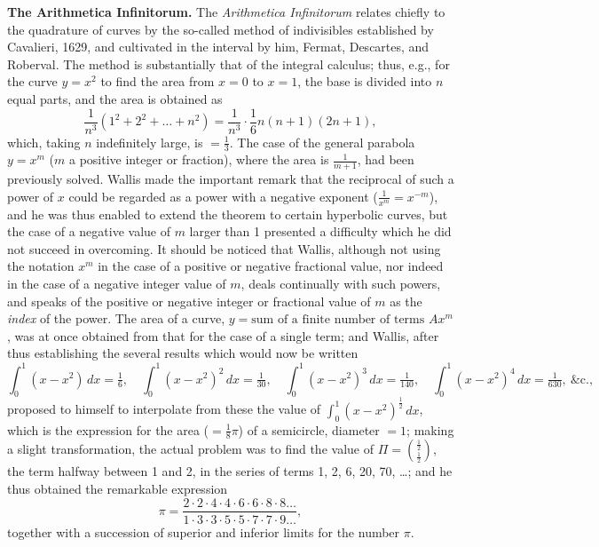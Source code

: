 \documentclass[11pt,a4paper]{book}
\begin{document}
\textbf{The Arithmetica Infinitorum.}\quad
The \textit{Arithmetica Infinitorum} relates chiefly to the quadrature of curves by the so-called method of indivisibles established by Cavalieri, 1629, and cultivated in the interval by him, Fermat, Descartes, and Roberval. The method is substantially that of the integral calculus; thus, e.g., for the curve $y = x^{2}$ to find the area from $x = 0$ to $x = 1$, the base is divided into $n$ equal parts, and the area is obtained as
\[
\frac{1}{n^{3}}(1^{2} + 2^{2} + \ldots + n^{2}) = \frac{1}{n^{3}} \cdot \frac{1}{6}n(n + 1)(2n + 1),
\]
which, taking $n$ indefinitely large, is $= \frac{1}{3}$. The case of the general parabola $y = x^{m}$ ($m$ a positive integer or fraction), where the area is $\frac{1}{m + 1}$, had been previously solved. Wallis made the important remark that the reciprocal of such a power of $x$ could be regarded as a power with a negative exponent ($\frac{1}{x^{m}} = x^{-m}$), and he was thus enabled to extend the theorem to certain hyperbolic curves, but the case of a negative value of $m$ larger than 1 presented a difficulty which he did not succeed in overcoming. It should be noticed that Wallis, although not using the notation $x^{m}$ in the case of a positive or negative fractional value, nor indeed in the case of a negative integer value of $m$, deals continually with such powers, and speaks of the positive or negative integer or fractional value of $m$ as the \textit{index} of the power. The area of a curve, $y = \text{sum of a finite number of terms } Ax^{m}$, was at once obtained from that for the case of a single term; and Wallis, after thus establishing the several results which would now be written
\[
\int_{0}^{1}(x - x^{2})\,dx = \tfrac{1}{6},\quad
\int_{0}^{1}(x - x^{2})^{2}\,dx = \tfrac{1}{30},\quad
\int_{0}^{1}(x - x^{2})^{3}\,dx = \tfrac{1}{140},\quad
\int_{0}^{1}(x - x^{2})^{4}\,dx = \tfrac{1}{630},\ \text{\&c.},
\]
proposed to himself to interpolate from these the value of $\int_{0}^{1}(x - x^{2})^{\frac{1}{2}}\,dx$, which is the expression for the area ($= \frac{1}{8}\pi$) of a semicircle, diameter $= 1$; making a slight transformation, the actual problem was to find the value of $\Pi = \binom{\frac{1}{2}}{\frac{1}{2}}$, the term halfway between 1 and 2, in the series of terms 1, 2, 6, 20, 70, \ldots; and he thus obtained the remarkable expression
\[
\pi = \frac{2 \cdot 2 \cdot 4 \cdot 4 \cdot 6 \cdot 6 \cdot 8 \cdot 8 \ldots}{1 \cdot 3 \cdot 3 \cdot 5 \cdot 5 \cdot 7 \cdot 7 \cdot 9 \ldots},
\]
together with a succession of superior and inferior limits for the number $\pi$.
\end{document}
